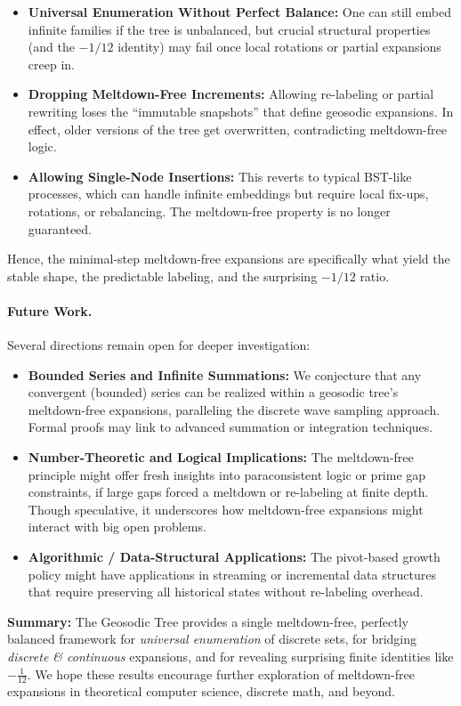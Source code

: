 \begin{itemize}
  \item \textbf{Universal Enumeration Without Perfect Balance:}
    One can still embed infinite families if the tree is unbalanced,
    but crucial structural properties (and the $-1/12$ identity)
    may fail once local rotations or partial expansions creep in.
  \item \textbf{Dropping Meltdown-Free Increments:}
    Allowing re-labeling or partial rewriting loses the “immutable
    snapshots” that define geosodic expansions. In effect, older versions
    of the tree get overwritten, contradicting meltdown-free logic.
  \item \textbf{Allowing Single-Node Insertions:}
    This reverts to typical BST-like processes, which can handle infinite
    embeddings but require local fix-ups, rotations, or rebalancing. 
    The meltdown-free property is no longer guaranteed.
\end{itemize}

Hence, the minimal-step meltdown-free expansions are specifically what yield
the stable shape, the predictable labeling, and the surprising $-1/12$ ratio.

\paragraph{Future Work.}
Several directions remain open for deeper investigation:
\begin{itemize}
  \item \textbf{Bounded Series and Infinite Summations:}
    We conjecture that any convergent (bounded) series can be realized
    within a geosodic tree’s meltdown-free expansions, paralleling
    the discrete wave sampling approach. Formal proofs may link to advanced
    summation or integration techniques.
  \item \textbf{Number-Theoretic and Logical Implications:}
    The meltdown-free principle might offer fresh insights into paraconsistent
    logic or prime gap constraints, if large gaps forced a meltdown or re-labeling
    at finite depth. Though speculative, it underscores how meltdown-free expansions
    might interact with big open problems.
  \item \textbf{Algorithmic / Data-Structural Applications:}
    The pivot-based growth policy might have applications in streaming or
    incremental data structures that require preserving all historical states
    without re-labeling overhead. 
\end{itemize}

\smallskip
\noindent
\textbf{Summary:} 
The Geosodic Tree provides a single meltdown-free, perfectly balanced framework
for \emph{universal enumeration} of discrete sets, for bridging \emph{discrete
\& continuous} expansions, and for revealing surprising finite identities like
$-\tfrac{1}{12}$. We hope these results encourage further exploration of 
meltdown-free expansions in theoretical computer science, discrete math, 
and beyond.
